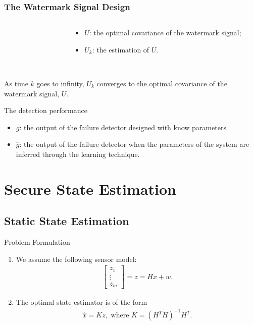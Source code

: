 \documentclass[10pt]{beamer}
\newcommand{\tikzdir}[1]{#1.tikz}
\newcommand{\inputtikz}[1]{}}
\begin{document}
\begin{frame}
  \frametitle{The Watermark Signal Design}
  \begin{columns}
    \begin{column}{0.6\textwidth}
      \begin{figure}[h!]
	\inputtikz{errU1_te}
      \end{figure}
    \end{column}
    \begin{column}{0.4\textwidth}
      \begin{itemize}
	\item $U$: the optimal covariance of the watermark signal;
	\item $U_k$: the estimation of $U$.
      \end{itemize}
    \end{column}
  \end{columns}
  ~\\
  As time $k$ goes to infinity, $U_k$ converges to the optimal covariance of the watermark signal, $U$.
\end{frame}

\begin{frame}{The detection performance}
  \begin{itemize}
    \item $g$: the output of the failure detector designed with know parameters
    \item $\hat g$: the output of the failure detector when the parameters of the system are inferred through the learning technique. 
  \end{itemize}
  \begin{figure}[h!]
    \centering
    \inputtikz{gng_te}
  \end{figure}
\end{frame}

\section{Secure State Estimation}
\subsection{Static State Estimation}

\begin{frame}{Problem Formulation}
  \begin{enumerate}
    \item We assume the following sensor model:
      \begin{align*}
	\begin{bmatrix}z_1\\\vdots\\z_m\end{bmatrix} =  z = Hx + w.
      \end{align*}
    \item The optimal state estimator is of the form
      \begin{align*}
	\hat x = Kz, \text{ where }K = (H^TH)^{-1}H^T.
      \end{align*}
  \end{enumerate}
\end{frame}
\end{document}
